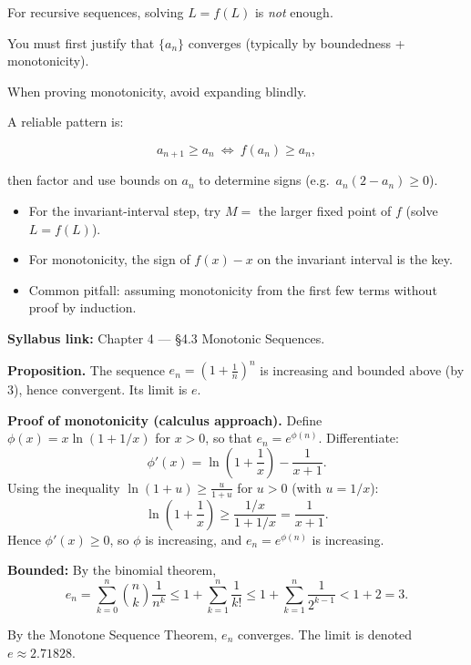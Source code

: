 \begin{commonmistake}

For recursive sequences, solving $L=f(L)$ is \emph{not} enough.

You must first justify that $\{a_n\}$ converges (typically by boundedness + monotonicity).

\end{commonmistake}

\begin{examtip}

When proving monotonicity, avoid expanding blindly.

A reliable pattern is:

\[
a_{n+1}\ge a_n \ \Longleftrightarrow\ f(a_n)\ge a_n,
\]

then factor and use bounds on $a_n$ to determine signs (e.g.\ $a_n(2-a_n)\ge 0$).

\begin{itemize}
\item For the invariant-interval step, try $M=$ the larger fixed point of $f$ (solve $L=f(L)$).
\item For monotonicity, the sign of $f(x)-x$ on the invariant interval is the key.
\item Common pitfall: assuming monotonicity from the first few terms without proof by induction.
\end{itemize}

\end{examtip}

\begin{extension}[title={Extension (Tutorial 8, Question 4: $(1+\frac{1}{n})^n$ is increasing)}]

\textbf{Syllabus link:} Chapter 4 --- \S4.3 Monotonic Sequences.

\medskip

\textbf{Proposition.} The sequence $e_n=\left(1+\frac{1}{n}\right)^n$ is increasing and bounded above (by $3$), hence convergent. Its limit is $e$.

\textbf{Proof of monotonicity (calculus approach).}
Define $\phi(x)=x\ln(1+1/x)$ for $x>0$, so that $e_n=e^{\phi(n)}$. Differentiate:
\[
\phi'(x)=\ln\!\left(1+\frac{1}{x}\right)-\frac{1}{x+1}.
\]
Using the inequality $\ln(1+u)\ge \frac{u}{1+u}$ for $u>0$ (with $u=1/x$):
\[
\ln\!\left(1+\frac{1}{x}\right)\ge \frac{1/x}{1+1/x}=\frac{1}{x+1}.
\]
Hence $\phi'(x)\ge 0$, so $\phi$ is increasing, and $e_n=e^{\phi(n)}$ is increasing.

\textbf{Bounded:} By the binomial theorem,
\[
e_n = \sum_{k=0}^{n}\binom{n}{k}\frac{1}{n^k}
\le 1 + \sum_{k=1}^{n}\frac{1}{k!}
\le 1 + \sum_{k=1}^{n}\frac{1}{2^{k-1}}
< 1 + 2 = 3.
\]

By the Monotone Sequence Theorem, $e_n$ converges. The limit is denoted $e\approx 2.71828$.

\end{extension}

